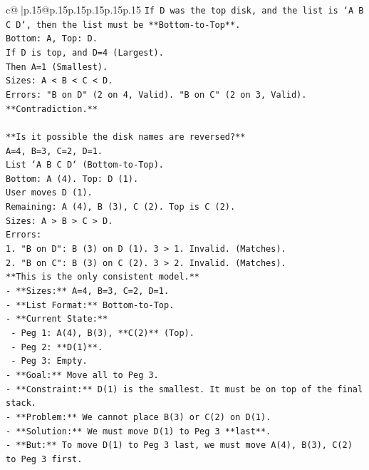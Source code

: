 \documentclass{article}
\begin{document}
{\begin{supertabular}{c@{$\;$}|p{.15\linewidth}@{}p{.15\linewidth}p{.15\linewidth}p{.15\linewidth}p{.15\linewidth}p{.15\linewidth}}
{{{\texttt{If D was the top disk, and the list is `A B C D`, then the list must be **Bottom{-}to{-}Top**.} \\
\texttt{Bottom: A, Top: D.} \\
\texttt{If D is top, and D=4 (Largest).} \\
\texttt{Then A=1 (Smallest).} \\
\texttt{Sizes: A < B < C < D.} \\
\texttt{Errors: "B on D" (2 on 4, Valid). "B on C" (2 on 3, Valid).} \\
\texttt{**Contradiction.**} \\
\\ 
\texttt{**Is it possible the disk names are reversed?**} \\
\texttt{A=4, B=3, C=2, D=1.} \\
\texttt{List `A B C D` (Bottom{-}to{-}Top).} \\
\texttt{Bottom: A (4). Top: D (1).} \\
\texttt{User moves D (1).} \\
\texttt{Remaining: A (4), B (3), C (2). Top is C (2).} \\
\texttt{Sizes: A > B > C > D.} \\
\texttt{Errors:} \\
\texttt{1. "B on D": B (3) on D (1). 3 > 1. Invalid. (Matches).} \\
\texttt{2. "B on C": B (3) on C (2). 3 > 2. Invalid. (Matches).} \\
\texttt{**This is the only consistent model.**} \\
\texttt{{-} **Sizes:** A=4, B=3, C=2, D=1.} \\
\texttt{{-} **List Format:** Bottom{-}to{-}Top.} \\
\texttt{{-} **Current State:**} \\
\texttt{  {-} Peg 1: A(4), B(3), **C(2)** (Top).} \\
\texttt{  {-} Peg 2: **D(1)**.} \\
\texttt{  {-} Peg 3: Empty.} \\
\texttt{{-} **Goal:** Move all to Peg 3.} \\
\texttt{{-} **Constraint:** D(1) is the smallest. It must be on top of the final stack.} \\
\texttt{{-} **Problem:** We cannot place B(3) or C(2) on D(1).} \\
\texttt{{-} **Solution:** We must move D(1) to Peg 3 **last**.} \\
\texttt{{-} **But:** To move D(1) to Peg 3 last, we must move A(4), B(3), C(2) to Peg 3 first.} \\
}}}
\end{supertabular}}
\end{document}
